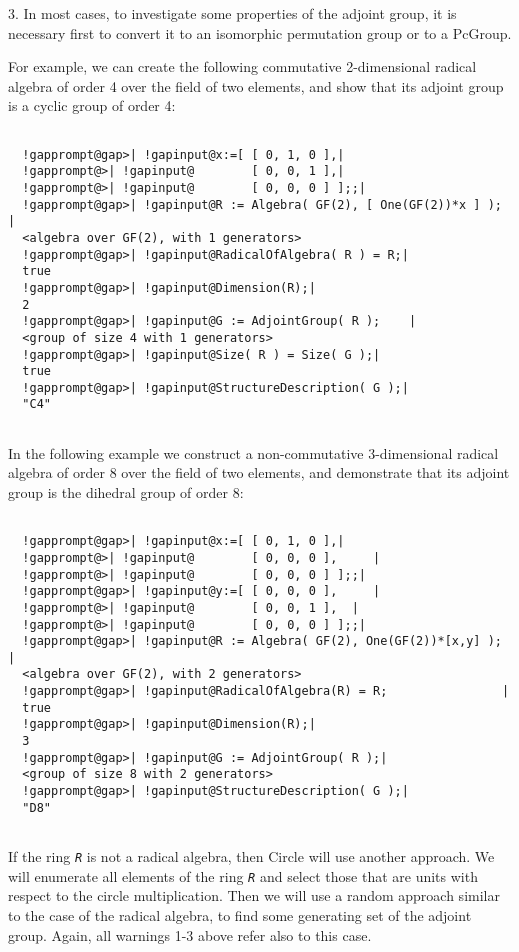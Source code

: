 \documentclass[a4paper,11pt]{report}
\begin{document}
{{{ 3. In most cases, to investigate some properties of the adjoint group, it is
necessary first to convert it to an isomorphic permutation group or to a
PcGroup. 

 For example, we can create the following commutative 2-dimensional radical
algebra of order 4 over the field of two elements, and show that its adjoint
group is a cyclic group of order 4: 
\begin{Verbatim}[commandchars=!@|,fontsize=\small,frame=single,label=Example]
  
  !gapprompt@gap>| !gapinput@x:=[ [ 0, 1, 0 ],|
  !gapprompt@>| !gapinput@        [ 0, 0, 1 ],|
  !gapprompt@>| !gapinput@        [ 0, 0, 0 ] ];;|
  !gapprompt@gap>| !gapinput@R := Algebra( GF(2), [ One(GF(2))*x ] );  |
  <algebra over GF(2), with 1 generators>
  !gapprompt@gap>| !gapinput@RadicalOfAlgebra( R ) = R;|
  true
  !gapprompt@gap>| !gapinput@Dimension(R);|
  2
  !gapprompt@gap>| !gapinput@G := AdjointGroup( R );    |
  <group of size 4 with 1 generators>
  !gapprompt@gap>| !gapinput@Size( R ) = Size( G );|
  true
  !gapprompt@gap>| !gapinput@StructureDescription( G );|
  "C4"
  
\end{Verbatim}
 In the following example we construct a non-commutative 3-dimensional radical
algebra of order 8 over the field of two elements, and demonstrate that its
adjoint group is the dihedral group of order 8: \pagebreak 
\begin{Verbatim}[commandchars=!@|,fontsize=\small,frame=single,label=Example]
  
  !gapprompt@gap>| !gapinput@x:=[ [ 0, 1, 0 ],|
  !gapprompt@>| !gapinput@        [ 0, 0, 0 ],     |
  !gapprompt@>| !gapinput@        [ 0, 0, 0 ] ];;|
  !gapprompt@gap>| !gapinput@y:=[ [ 0, 0, 0 ],     |
  !gapprompt@>| !gapinput@        [ 0, 0, 1 ],  |
  !gapprompt@>| !gapinput@        [ 0, 0, 0 ] ];;|
  !gapprompt@gap>| !gapinput@R := Algebra( GF(2), One(GF(2))*[x,y] );  |
  <algebra over GF(2), with 2 generators>
  !gapprompt@gap>| !gapinput@RadicalOfAlgebra(R) = R;                |
  true
  !gapprompt@gap>| !gapinput@Dimension(R);|
  3
  !gapprompt@gap>| !gapinput@G := AdjointGroup( R );|
  <group of size 8 with 2 generators>
  !gapprompt@gap>| !gapinput@StructureDescription( G );|
  "D8"
  
\end{Verbatim}
 If the ring \mbox{\texttt{\mdseries\slshape R}} is not a radical algebra, then \textsf{Circle} will use another approach. We will enumerate all elements of the ring \mbox{\texttt{\mdseries\slshape R}} and select those that are units with respect to the circle multiplication.
Then we will use a random approach similar to the case of the radical algebra,
to find some generating set of the adjoint group. Again, all warnings 1-3
above refer also to this case. 

}}}
\end{document}
